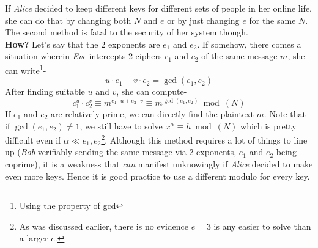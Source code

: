 		\begin{tcolorbox}[title=Multiple encryption exponents for the same modulo, breakable, colback=yellow!5!white,colframe=yellow!75!black]
 			If \emph{Alice} decided to keep different keys for different sets of people in her online life, she can do that by changing both $N$ and $e$ or by just changing \(e\) for the same \(N\). The second method is fatal to the security of her system though.\\
 			\textbf{How?}\vspace{0.5cm}
 			Let's say that the 2 exponents are \(e_1\) and \(e_2\). If somehow, there comes a situation wherein \emph{Eve} intercepts 2 ciphers \(c_1\) and \(c_2\) of the same message \(m\), she can write\footnote{Using the \hyperref[subsec:gcd]{property of gcd}}-
 			\[u\cdot e_1 + v \cdot e_2 = \gcd(e_1, e_2)\]
 			After finding suitable \(u\) and \(v\), she can compute-
 			\[c_1^u \cdot c_2^v \equiv m^{e_1\cdot u + e_2 \cdot v}\equiv m^{\gcd(e_1,e_2)} \bmod(N)\]
 			If $e_1$ and $e_2$ are relatively prime, we can directly find the plaintext \(m\).\vspace{0.5cm}
 			Note that if \(\gcd(e_1, e_2)\not = 1\), we still have to solve \(x^\alpha\equiv h \bmod(N)\) which is pretty difficult even if \(\alpha \ll e_1, e_2\)\footnote{As was discussed earlier, there is no evidence $e=3$ is any easier to solve than a larger \(e\).}. 
 			\tcblower
 			Although this method requires a lot of things to line up (\emph{Bob} verifiably sending the same message via 2 exponents, \(e_1\) and \(e_2\) being coprime), it is a weakness that \emph{can} manifest unknowingly if \emph{Alice} decided to make even more keys. Hence it is good practice to use a different modulo for every key. 
		\end{tcolorbox}

